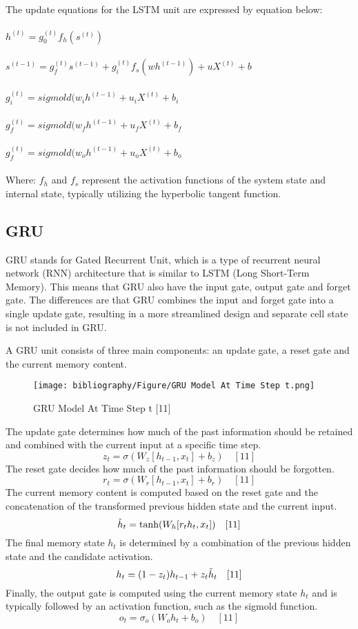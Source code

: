 \documentclass{ieeeojies}
\begin{document}
The update equations for the LSTM unit are expressed by equation below: \\
\\$h^{(t)} = g_0^{(t)}f_h(s^{(t)})$ \quad[11]\\
\\$s^{(t-1)} = g_f^{(t)}s^{(t-1)} + g_i^{(t)}f_s(wh^{(t-1)}) + uX^{(t)} + b$ \quad[11]\\
\\$g_i^{(t)} = sigmold (w_ih^{(t-1)} + u_iX^{(t)} + b_i$ \quad[11]\\
\\$g_f^{(t)} = sigmold (w_fh^{(t-1)} + u_fX^{(t)} + b_f$ \quad[11]\\
\\$g_f^{(t)} = sigmold (w_oh^{(t-1)} + u_oX^{(t)} + b_o$ \quad[11]\\
\\ Where: $f_h$ and $f_s$
represent the activation functions of the 
system state and internal state, typically utilizing the 
hyperbolic tangent function.

\subsection{GRU}
GRU stands for Gated Recurrent Unit, which is a type of recurrent neural network (RNN) architecture that is similar to LSTM (Long Short-Term Memory). This means that GRU also have the input gate, output gate and forget gate. The differences are that GRU combines the input and forget gate into a single update gate, resulting in a more streamlined design and separate cell state is not included in GRU.

A GRU unit consists of three main components: an update gate, a reset gate and the current memory content.

\begin{figure}[H]
  \centering
  \begin{minipage}{0.9\linewidth}
    \centering
    \texttt{[image: bibliography/Figure/GRU Model At Time Step t.png]}
    \caption{GRU Model At Time Step t [11]}
    \label{fig10}
  \end{minipage}
\end{figure}

The update gate determines how much of the past information should be retained and combined with the current input at a specific time step.
\[z_t = \sigma(W_z[h_{t-1},x_t] + b_z)\quad[11]\]
The reset gate decides how much of the past information should be forgotten.
\[r_t = \sigma(W_r[h_{t-1},x_t] + b_r)\quad[11]\]
The current memory content is computed based on the reset gate and the concatenation of the transformed previous hidden state and the current input.
\[\Tilde{h}_t = \tanh(W_h[r_{t}h_{t},x_t])\quad[11]\]
The final memory state $h_t$ is determined by a combination of the previous hidden state and the candidate activation.
\[h_t = (1 - z_t)h_{t-1} + z_{t}\Tilde{h}_t\quad[11]\]
Finally, the output gate is computed using the current memory state $h_t$ and is typically followed by an activation function, such as the sigmold function.
\[o_t = \sigma_o(W_{o}h_t + b_o)\quad[11]\]
\end{document}
